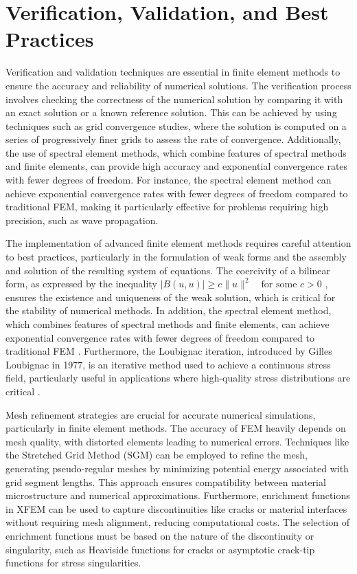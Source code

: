 \documentclass[12pt, a4paper]{article}
\begin{document}
\section{Verification, Validation, and Best Practices}
\label{sec:8df36f36-bed7-422c-b89b-fa3caa38ecc4}

Verification and validation techniques are essential in finite element methods to ensure the accuracy and reliability of numerical solutions. The verification process involves checking the correctness of the numerical solution by comparing it with an exact solution or a known reference solution. This can be achieved by using techniques such as grid convergence studies, where the solution is computed on a series of progressively finer grids to assess the rate of convergence. Additionally, the use of spectral element methods, which combine features of spectral methods and finite elements, can provide high accuracy and exponential convergence rates with fewer degrees of freedom. For instance, the spectral element method can achieve exponential convergence rates with fewer degrees of freedom compared to traditional FEM, making it particularly effective for problems requiring high precision, such as wave propagation.

The implementation of advanced finite element methods requires careful attention to best practices, particularly in the formulation of weak forms and the assembly and solution of the resulting system of equations. The coercivity of a bilinear form, as expressed by the inequality \(|B(u, u)| \geq c\|u\|^2 \quad \text{for some } c > 0\) \cite{src:wiki_babu_ka_lax_milgram_theorem-a334b87f26cc}, ensures the existence and uniqueness of the weak solution, which is critical for the stability of numerical methods. In addition, the spectral element method, which combines features of spectral methods and finite elements, can achieve exponential convergence rates with fewer degrees of freedom compared to traditional FEM \cite{src:wiki_spectral_element_method-55f1a6279df2}. Furthermore, the Loubignac iteration, introduced by Gilles Loubignac in 1977, is an iterative method used to achieve a continuous stress field, particularly useful in applications where high-quality stress distributions are critical \cite{src:wiki_loubignac_iteration-e95e15d92e36}.

Mesh refinement strategies are crucial for accurate numerical simulations, particularly in finite element methods. The accuracy of FEM heavily depends on mesh quality, with distorted elements leading to numerical errors. Techniques like the Stretched Grid Method (SGM) can be employed to refine the mesh, generating pseudo-regular meshes by minimizing potential energy associated with grid segment lengths. This approach ensures compatibility between material microstructure and numerical approximations. Furthermore, enrichment functions in XFEM can be used to capture discontinuities like cracks or material interfaces without requiring mesh alignment, reducing computational costs. The selection of enrichment functions must be based on the nature of the discontinuity or singularity, such as Heaviside functions for cracks or asymptotic crack-tip functions for stress singularities.
\end{document}
